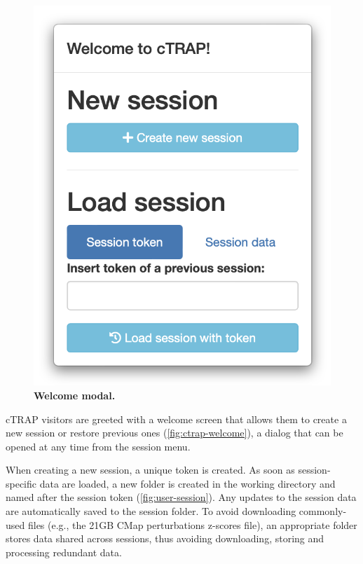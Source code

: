 \begin{figure}
  \vspace{-2\intextsep}
  \includegraphics[width=\linewidth]{images/ctrap/welcome}
  \caption[Welcome screen modal]{\textbf{Welcome modal.}}
  \vspace{-1\intextsep}
  \label{fig:ctrap-welcome}
\end{figure}

cTRAP visitors are greeted with a welcome screen that allows them to create a new session or restore previous ones (\autoref{fig:ctrap-welcome}), a dialog that can be opened at any time from the session menu.

When creating a new session, a unique token is created. As soon as session-specific data are loaded, a new folder is created in the working directory and named after the session token (\autoref{fig:user-session}). Any updates to the session data are automatically saved to the session folder. To avoid downloading commonly-used files (e.g., the 21GB CMap perturbations z-scores file), an appropriate folder stores data shared across sessions, thus avoiding downloading, storing and processing redundant data.

